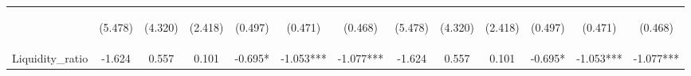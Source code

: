 \documentclass[]{article}
\begin{document}
\begin{center}
\begin{tabular}{lcccccccccccc}
\vspace{4pt} & \begin{footnotesize}(5.478)\end{footnotesize} & \begin{footnotesize}(4.320)\end{footnotesize} & \begin{footnotesize}(2.418)\end{footnotesize} & \begin{footnotesize}(0.497)\end{footnotesize} & \begin{footnotesize}(0.471)\end{footnotesize} & \begin{footnotesize}(0.468)\end{footnotesize} & \begin{footnotesize}(5.478)\end{footnotesize} & \begin{footnotesize}(4.320)\end{footnotesize} & \begin{footnotesize}(2.418)\end{footnotesize} & \begin{footnotesize}(0.497)\end{footnotesize} & \begin{footnotesize}(0.471)\end{footnotesize} & \begin{footnotesize}(0.468)\end{footnotesize} \\
Liquidity\_ratio & -1.624 & 0.557 & 0.101 & -0.695* & -1.053*** & -1.077*** & -1.624 & 0.557 & 0.101 & -0.695* & -1.053*** & -1.077*** \\

\end{tabular}
\end{center}
\end{document}
